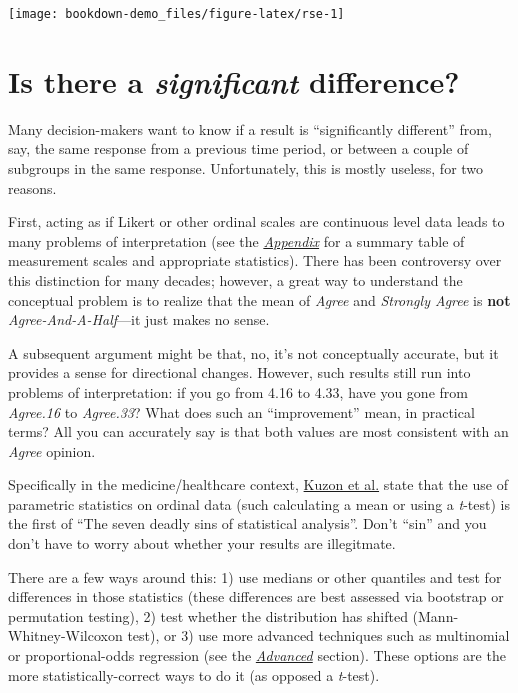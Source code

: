 \documentclass[]{book}
\begin{document}
\begin{center}\texttt{[image: bookdown-demo\_files/figure-latex/rse-1]} \end{center}

\chapter{\texorpdfstring{Is there a \emph{significant}
difference?}{Is there a significant difference?}}\label{is-there-a-significant-difference}

Many decision-makers want to know if a result is ``significantly
different'' from, say, the same response from a previous time period, or
between a couple of subgroups in the same response. Unfortunately, this
is mostly useless, for two reasons.

First, acting as if Likert or other ordinal scales are continuous level
data leads to many problems of interpretation (see the
\protect\hyperlink{Appendix}{\emph{Appendix}} for a summary table of
measurement scales and appropriate statistics). There has been
controversy over this distinction for many decades; however, a great way
to understand the conceptual problem is to realize that the mean of
\emph{Agree} and \emph{Strongly Agree} is \textbf{not}
\emph{Agree-And-A-Half}---it just makes no sense.

A subsequent argument might be that, no, it's not conceptually accurate,
but it provides a sense for directional changes. However, such results
still run into problems of interpretation: if you go from 4.16 to 4.33,
have you gone from \emph{Agree.16} to \emph{Agree.33}? What does such an
``improvement'' mean, in practical terms? All you can accurately say is
that both values are most consistent with an \emph{Agree} opinion.

Specifically in the medicine/healthcare context,
\href{https://www.ncbi.nlm.nih.gov/pubmed/8883724}{Kuzon et al.} state
that the use of parametric statistics on ordinal data (such calculating
a mean or using a \emph{t}-test) is the first of ``The seven deadly sins
of statistical analysis''. Don't ``sin'' and you don't have to worry
about whether your results are illegitmate.

There are a few ways around this: 1) use medians or other quantiles and
test for differences in those statistics (these differences are best
assessed via bootstrap or permutation testing), 2) test whether the
distribution has shifted (Mann-Whitney-Wilcoxon test), or 3) use more
advanced techniques such as multinomial or proportional-odds regression
(see the \protect\hyperlink{Advanced}{\emph{Advanced}} section). These
options are the more statistically-correct ways to do it (as opposed a
\emph{t}-test).
\end{document}
